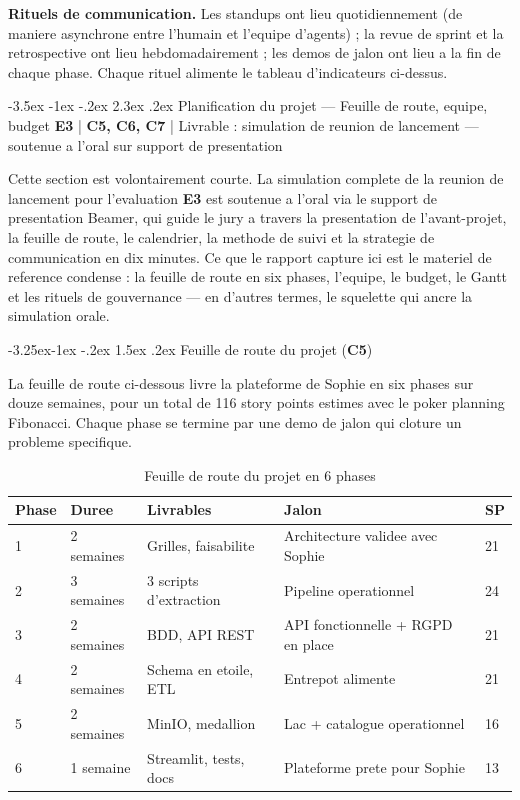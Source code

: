 \documentclass[a4paper,11pt,oneside,openany]{report}
\makeatletter
\renewcommand\section{\@startsection{section}{1}{\z@}%
  {-3.5ex \@plus -1ex \@minus -.2ex}%
  {2.3ex \@plus.2ex}%
  {\normalfont\Large\bfseries\color{ntgreen}}}
\renewcommand\subsection{\@startsection{subsection}{2}{\z@}%
  {-3.25ex\@plus -1ex \@minus -.2ex}%
  {1.5ex \@plus .2ex}%
  {\normalfont\large\bfseries\color{ntdarkgreen}}}
\newcommand{\competence}[1]{\textbf{\textcolor{ntgreen}{#1}}}
\newcommand{\evaluation}[1]{\textbf{\textcolor{ntblue}{#1}}}
\newcommand{\rgpd}{RGPD}
\makeatother
\begin{document}
\textbf{Rituels de communication.} Les standups ont lieu
quotidiennement (de maniere asynchrone entre l'humain et l'equipe
d'agents) ; la revue de sprint et la retrospective ont lieu
hebdomadairement ; les demos de jalon ont lieu a la fin de chaque
phase. Chaque rituel alimente le tableau d'indicateurs ci-dessus.


\section{Planification du projet --- Feuille de route, equipe, budget}
\label{sec:e3}
{\small\evaluation{E3} | \competence{C5, C6, C7} |
Livrable : simulation de reunion de lancement --- soutenue a l'oral
sur support de presentation}

Cette section est volontairement courte. La simulation complete de la
reunion de lancement pour l'evaluation \evaluation{E3} est soutenue a
l'oral via le support de presentation Beamer, qui guide le jury a
travers la presentation de l'avant-projet, la feuille de route, le
calendrier, la methode de suivi et la strategie de communication en
dix minutes. Ce que le rapport capture ici est le materiel de
reference condense : la feuille de route en six phases, l'equipe, le
budget, le Gantt et les rituels de gouvernance --- en d'autres termes,
le squelette qui ancre la simulation orale.

\subsection{Feuille de route du projet (\competence{C5})}

La feuille de route ci-dessous livre la plateforme de Sophie en six
phases sur douze semaines, pour un total de 116 story points estimes
avec le poker planning Fibonacci. Chaque phase se termine par une
demo de jalon qui cloture un probleme specifique.

\begin{table}[H]
\centering
\caption{Feuille de route du projet en 6 phases}
\label{tab:roadmap}
\begin{tabularx}{\textwidth}{L{1cm} L{2cm} L{3cm} L{5cm} C{1.5cm}}
\toprule
\textbf{Phase} & \textbf{Duree} & \textbf{Livrables} & \textbf{Jalon} & \textbf{SP} \\
 & 2 semaines & Grilles, faisabilite & Architecture validee avec Sophie & 21 \\
2 & 3 semaines & 3 scripts d'extraction & Pipeline operationnel & 24 \\
3 & 2 semaines & BDD, API REST & API fonctionnelle + \rgpd{} en place & 21 \\
4 & 2 semaines & Schema en etoile, ETL & Entrepot alimente & 21 \\
5 & 2 semaines & MinIO, medallion & Lac + catalogue operationnel & 16 \\
6 & 1 semaine & Streamlit, tests, docs & Plateforme prete pour Sophie & 13 \\
\bottomrule
\end{tabularx}
\end{table}
\end{document}
